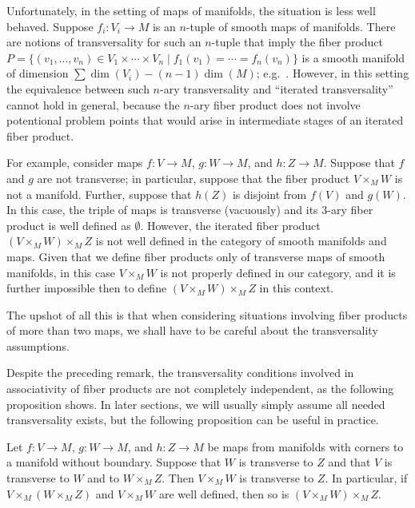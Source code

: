 \begin{remark}
	Unfortunately, in the setting of maps of manifolds, the situation is less well behaved.
	Suppose $f_i \colon V_i \to M$ is an $n$-tuple of smooth maps of manifolds.
	There are notions of transversality for such an $n$-tuple that imply the fiber product $P = \{(v_1,\ldots, v_n) \in V_1 \times \cdots \times V_n \mid f_1(v_1) = \cdots = f_n(v_n)\}$ is a smooth manifold of dimension $\sum\dim(V_i)-(n-1)\dim(M)$; e.g.\ \cite[Theorem 7.2.7]{MaDo92}.
	However, in this setting the equivalence between such $n$-ary transversality and ``iterated transversality'' cannot hold in general, because the $n$-ary fiber product does not involve potentional problem points that would arise in intermediate stages of an iterated fiber product.

	For example, consider maps $f \colon V \to M$, $g \colon W \to M$, and $h \colon Z \to M$.
	Suppose that $f$ and $g$ are not transverse; in particular, suppose that the fiber product $V \times_MW$ is not a manifold.
	Further, suppose that $h(Z)$ is disjoint from $f(V)$ and $g(W)$.
	In this case, the triple of maps is transverse (vacuously) and its 3-ary fiber product is well defined as $\emptyset$.
	However, the iterated fiber product $(V \times_MW) \times_M Z$ is not well defined in the category of smooth manifolds and maps.
	Given that we define fiber products only of transverse maps of smooth manifolds, in this case $V \times_M W$ is not properly defined in our category, and it is further impossible then to define $(V \times_MW) \times_M Z$ in this context.

	The upshot of all this is that when considering situations involving fiber products of more than two maps, we shall have to be careful about the transversality assumptions.
\end{remark}

Despite the preceding remark, the transversality conditions involved in associativity of fiber products are not completely independent, as the following proposition shows. In later sections, we will usually simply assume all needed transversality exists, but the following proposition can be useful in practice.

\begin{proposition}\label{P: 3 out of 4 trans}
	Let $f \colon V \to M$, $g \colon W \to M$, and $h \colon Z \to M$ be maps from manifolds with corners to a manifold without boundary. Suppose that $W$ is transverse to $Z$ and that $V$ is transverse to $W$ and to $W \times_MZ$. Then $V \times_MW$ is transverse to $Z$. In particular, if $V \times_M(W \times_MZ)$ and $V \times_MW$ are well defined, then so is $(V \times_MW) \times_M Z$.
\end{proposition}

